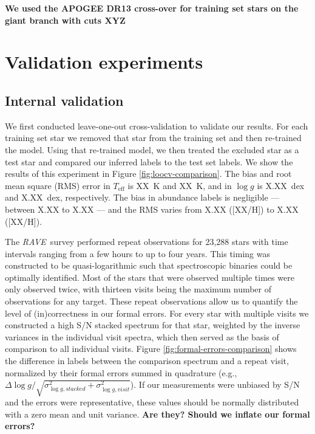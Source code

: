 \documentclass[preprint,trackchanges]{aastex}
\newcommand{\project}[1]{\textsl{#1}}
\newcommand{\acronym}[1]{{\small{#1}}}
\newcommand{\rave}{\project{\acronym{RAVE}}}
\newcommand{\logg}{\log g}
\newcommand{\teff}{T_{\mathrm{eff}}}
\newcommand{\stub}[1]{\textbf{#1}}
\begin{document}
% 

\stub{We used the APOGEE DR13 cross-over for training set stars on the giant branch with cuts XYZ}







\section{Validation experiments}
\label{sec:validation}


\subsection{Internal validation}
We first conducted leave-one-out cross-validation to validate our results.
For each training set star we removed that star from the training set and
then re-trained the model.  Using that re-trained model, we then treated
the excluded star as a test star and compared our inferred labels to the
test set labels.  We show the results of this experiment in Figure
\ref{fig:loocv-comparison}.  The bias and root mean square (RMS) error in 
$\teff$ is XX~K and XX~K, and in $\logg$ is X.XX~dex and X.XX~dex,
respectively.  The bias in abundance labels is negligible --- between
X.XX to X.XX --- and the RMS varies from X.XX ([XX/H]) to X.XX ([XX/H]).


The \rave\ survey performed repeat observations for 23,288 stars  with time 
intervals ranging from a few hours to up to four years.  This timing was 
constructed to be quasi-logarithmic such that spectroscopic binaries could
be optimally identified. Most of the stars that were observed multiple times
were only observed twice, with thirteen visits being the maximum number 
of observations for any target.  These repeat observations allow us to 
quantify the level of (in)correctness in our formal errors.  For every star
with multiple visits we constructed a high S/N stacked spectrum for that
star, weighted by the inverse variances in the individual visit spectra,
which then served as the basis of comparison to all individual visits.  
Figure \ref{fig:formal-errors-comparison} shows the difference in labels 
between the comparison spectrum and a repeat visit, normalized by their 
formal errors summed in quadrature (e.g., $\Delta\logg/\sqrt{\sigma_{\logg,stacked}^2 + \sigma_{\logg,visit}^2}$).
If our measurements were unbiased by S/N and the errors were representative, 
these values should be normally distributed with a zero mean and unit variance.
\stub{Are they? Should we inflate our formal errors?}
\end{document}
